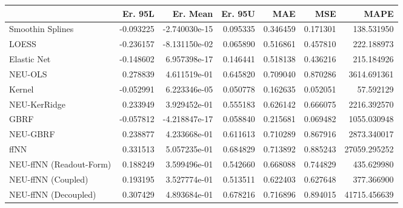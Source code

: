 \begin{tabular}{lrrrrrr}
\toprule
{} &   Er. 95L &      Er. Mean &   Er. 95U &       MAE &       MSE &          MAPE \\
\midrule
Smoothin Splines        & -0.093225 & -2.740030e-15 &  0.095335 &  0.346459 &  0.171301 &    138.531950 \\
LOESS                   & -0.236157 & -8.131150e-02 &  0.065890 &  0.516861 &  0.457810 &    222.188973 \\
Elastic Net             & -0.148602 &  6.957398e-17 &  0.146441 &  0.518138 &  0.436216 &    215.184926 \\
NEU-OLS                 &  0.278839 &  4.611519e-01 &  0.645820 &  0.709040 &  0.870286 &   3614.691361 \\
Kernel                  & -0.052991 &  6.223346e-05 &  0.050778 &  0.162635 &  0.052051 &     57.592129 \\
NEU-KerRidge            &  0.233949 &  3.929452e-01 &  0.555183 &  0.626142 &  0.666075 &   2216.392570 \\
GBRF                    & -0.057812 & -4.218847e-17 &  0.058840 &  0.215681 &  0.069482 &   1055.030948 \\
NEU-GBRF                &  0.238877 &  4.233668e-01 &  0.611613 &  0.710289 &  0.867916 &   2873.340017 \\
ffNN                    &  0.331513 &  5.057235e-01 &  0.684829 &  0.713892 &  0.885243 &  27059.295252 \\
NEU-ffNN (Readout-Form) &  0.188249 &  3.599496e-01 &  0.542660 &  0.668088 &  0.744829 &    435.629980 \\
NEU-ffNN (Coupled)      &  0.193195 &  3.527774e-01 &  0.513511 &  0.622403 &  0.627648 &    377.366900 \\
NEU-ffNN (Decoupled)    &  0.307429 &  4.893684e-01 &  0.678216 &  0.716896 &  0.894015 &  41715.456639 \\
\bottomrule
\end{tabular}
